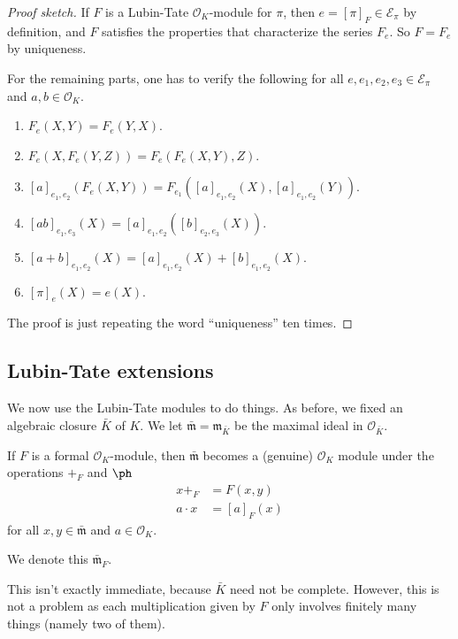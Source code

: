 \documentclass[a4paper]{article}
\begin{document}
\begin{proof}[Proof sketch]
  If $F$ is a Lubin-Tate $\mathcal{O}_K$-module for $\pi$, then $e = [\pi]_F \in \mathcal{E}_\pi$ by definition, and $F$ satisfies the properties that characterize the series $F_e$. So $F = F_e$ by uniqueness.

  For the remaining parts, one has to verify the following for all $e, e_1, e_2, e_3 \in \mathcal{E}_\pi$ and $a, b \in \mathcal{O}_K$.
  \begin{enumerate}
    \item $F_e(X, Y) = F_e(Y, X)$.
    \item $F_e(X, F_e(Y, Z)) = F_e(F_e(X, Y), Z)$.
    \item $[a]_{e_1, e_2}(F_e(X, Y)) = F_{e_1}([a]_{e_1, e_2}(X), [a]_{e_1, e_2}(Y))$.
    \item $[ab]_{e_1, e_3}(X) = [a]_{e_1, e_2} ([b]_{e_2, e_3}(X))$.
    \item $[a + b]_{e_1, e_2}(X) = [a]_{e_1, e_2}(X) + [b]_{e_1, e_2}(X)$.
    \item $[\pi]_e(X) = e(X)$.
  \end{enumerate}
  The proof is just repeating the word ``uniqueness'' ten times.
\end{proof}

\subsection{Lubin-Tate extensions}
We now use the Lubin-Tate modules to do things. As before, we fixed an algebraic closure $\bar{K}$ of $K$. We let $\bar{\mathfrak{m}} = \mathfrak{m}_{\bar{K}}$ be the maximal ideal in $\mathcal{O}_{\bar{K}}$.

\begin{prop}
  If $F$ is a formal $\mathcal{O}_K$-module, then $\bar{\mathfrak{m}}$ becomes a (genuine) $\mathcal{O}_K$ module under the operations $+_F$ and $\ph$
  \begin{align*}
    x +_F &= F(x, y)\\
    a\cdot x &= [a]_F(x)
  \end{align*}
  for all $x, y \in \bar{\mathfrak{m}}$ and $a \in \mathcal{O}_K$.

  We denote this $\bar{\mathfrak{m}}_F$.
\end{prop}
This isn't exactly immediate, because $\bar{K}$ need not be complete. However, this is not a problem as each multiplication given by $F$ only involves finitely many things (namely two of them).
\end{document}
